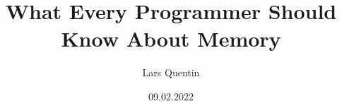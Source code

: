 \documentclass{beamer}
\title{What Every Programmer Should Know About Memory}
\author{Lars Quentin}
\date{09.02.2022}
\begin{document}
\frame{\titlepage}
\end{document}
